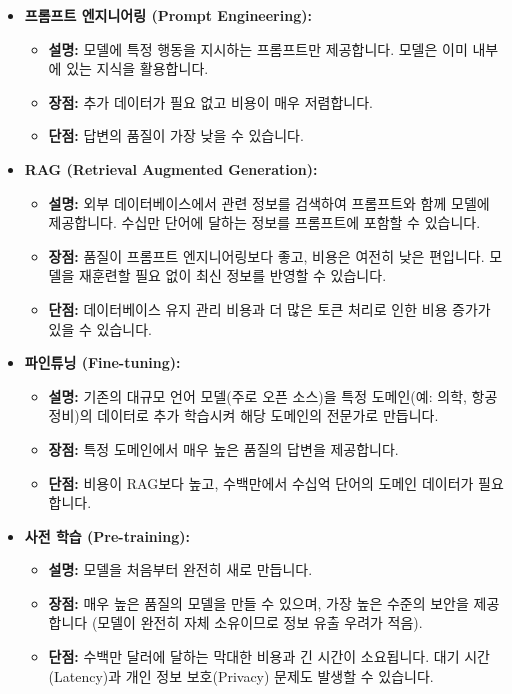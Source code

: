 \documentclass[11pt,a4paper]{article}
\theoremstyle{definition}
\begin{document}
\begin{itemize}
    \item \textbf{프롬프트 엔지니어링 (Prompt Engineering):}
    \begin{itemize}
        \item \textbf{설명:} 모델에 특정 행동을 지시하는 프롬프트만 제공합니다. 모델은 이미 내부에 있는 지식을 활용합니다.
        \item \textbf{장점:} 추가 데이터가 필요 없고 비용이 매우 저렴합니다.
        \item \textbf{단점:} 답변의 품질이 가장 낮을 수 있습니다.
    \end{itemize}

    \item \textbf{RAG (Retrieval Augmented Generation):}
    \begin{itemize}
        \item \textbf{설명:} 외부 데이터베이스에서 관련 정보를 검색하여 프롬프트와 함께 모델에 제공합니다. 수십만 단어에 달하는 정보를 프롬프트에 포함할 수 있습니다.
        \item \textbf{장점:} 품질이 프롬프트 엔지니어링보다 좋고, 비용은 여전히 낮은 편입니다. 모델을 재훈련할 필요 없이 최신 정보를 반영할 수 있습니다.
        \item \textbf{단점:} 데이터베이스 유지 관리 비용과 더 많은 토큰 처리로 인한 비용 증가가 있을 수 있습니다.
    \end{itemize}

    \item \textbf{파인튜닝 (Fine-tuning):}
    \begin{itemize}
        \item \textbf{설명:} 기존의 대규모 언어 모델(주로 오픈 소스)을 특정 도메인(예: 의학, 항공 정비)의 데이터로 추가 학습시켜 해당 도메인의 전문가로 만듭니다.
        \item \textbf{장점:} 특정 도메인에서 매우 높은 품질의 답변을 제공합니다.
        \item \textbf{단점:} 비용이 RAG보다 높고, 수백만에서 수십억 단어의 도메인 데이터가 필요합니다.
    \end{itemize}

    \item \textbf{사전 학습 (Pre-training):}
    \begin{itemize}
        \item \textbf{설명:} 모델을 처음부터 완전히 새로 만듭니다.
        \item \textbf{장점:} 매우 높은 품질의 모델을 만들 수 있으며, 가장 높은 수준의 보안을 제공합니다 (모델이 완전히 자체 소유이므로 정보 유출 우려가 적음).
        \item \textbf{단점:} 수백만 달러에 달하는 막대한 비용과 긴 시간이 소요됩니다. 대기 시간(Latency)과 개인 정보 보호(Privacy) 문제도 발생할 수 있습니다.
    \end{itemize}
\end{itemize}
\end{document}
